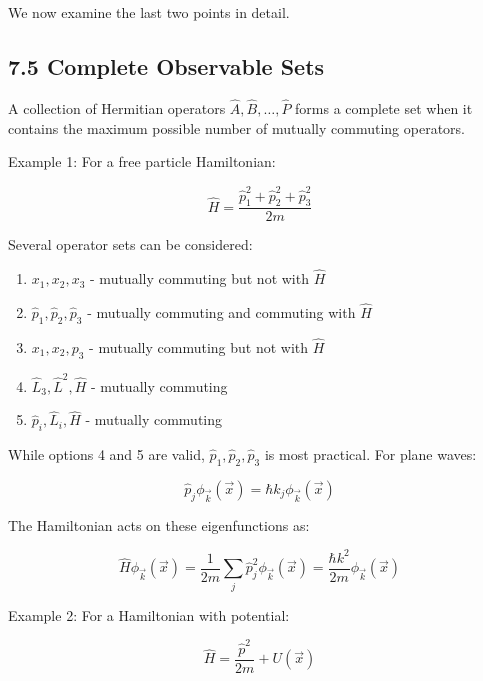 \documentclass[italian]{HKNdocument}
\begin{document}
We now examine the last two points in detail.

\subsection*{7.5 Complete Observable Sets}
A collection of Hermitian operators $\hat{A}, \hat{B}, \ldots, \hat{P}$ forms a complete set when it contains the maximum possible number of mutually commuting operators.

Example 1: For a free particle Hamiltonian:

\begin{equation*}
\hat{H}=\frac{\hat{p}_{1}^{2}+\hat{p}_{2}^{2}+\hat{p}_{3}^{2}}{2 m} \tag{7.38}
\end{equation*}

Several operator sets can be considered:
\begin{enumerate}
  \item $x_{1}, x_{2}, x_{3}$ - mutually commuting but not with $\hat{H}$
  \item $\hat{p}_{1}, \hat{p}_{2}, \hat{p}_{3}$ - mutually commuting and commuting with $\hat{H}$
  \item $x_{1}, x_{2}, p_{3}$ - mutually commuting but not with $\hat{H}$
  \item $\hat{L}_{3}, \hat{L}^{2}, \hat{H}$ - mutually commuting
  \item $\hat{p}_{i}, \hat{L}_{i}, \hat{H}$ - mutually commuting
\end{enumerate}

While options 4 and 5 are valid, $\hat{p}_{1}, \hat{p}_{2}, \hat{p}_{3}$ is most practical. For plane waves:

\begin{equation*}
\hat{p}_{j} \phi_{\vec{k}}(\vec{x})=\hbar k_{j} \phi_{\vec{k}}(\vec{x}) \tag{7.39}
\end{equation*}

The Hamiltonian acts on these eigenfunctions as:

\begin{equation*}
\hat{H} \phi_{\vec{k}}(\vec{x})=\frac{1}{2 m} \sum_{j} \hat{p}_{j}^{2} \phi_{\vec{k}}(\vec{x})=\frac{\hbar k^{2}}{2 m} \phi_{\vec{k}}(\vec{x}) \tag{7.40}
\end{equation*}

Example 2: For a Hamiltonian with potential:

\begin{equation*}
\hat{H}=\frac{\hat{p}^{2}}{2 m}+U(\vec{x}) \tag{7.41}
\end{equation*}
\end{document}
